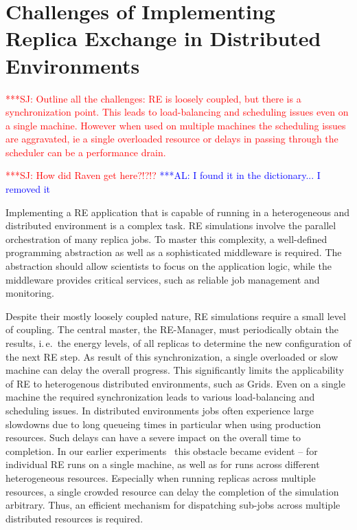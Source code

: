 \documentclass{rspublic}
\newcommand{\alnote}[1]{ {\textcolor{blue} { ***AL: #1 }}}
\newcommand{\jhanote}[1]{ {\textcolor{red} { ***SJ: #1 }}}
\newcommand{\alnote}[1]{}
\newcommand{\jhanote}[1]{}
\begin{document}

\section{Challenges of Implementing Replica Exchange in Distributed
  Environments}
\label{sec:challenges}
\jhanote{Outline all the challenges: RE is loosely coupled, but there
  is a synchronization point. This leads to load-balancing and
  scheduling issues even on a single machine. However when used on
  multiple machines the scheduling issues are aggravated, ie a single
  overloaded resource or delays in passing through the scheduler can
  be a performance drain.}                
                                               

\jhanote{How did Raven get here?!?!?}
\alnote{I found it in the dictionary... I removed it}  

Implementing a RE application that is capable of running in a
heterogeneous and distributed environment is a complex task. RE simulations 
involve the parallel orchestration of many replica jobs. To master 
this complexity, a well-defined programming abstraction as well
as a sophisticated middleware is required. The abstraction
should allow scientists to focus on the application logic, while the 
middleware provides critical services, such as reliable 
job management and monitoring.

Despite their mostly loosely coupled nature, RE simulations require
a small level of coupling.  The central master, the RE-Manager, must
periodically obtain the results, i.\,e.\ the energy levels, of all
replicas to determine the new configuration of the next RE step.  As
result of this synchronization, a single overloaded or slow machine
can delay the overall progress. This significantly limits the
applicability of RE to heterogenous distributed environments, such
as Grids.  Even on a single machine the required synchronization leads
to various load-balancing and scheduling issues. In distributed
environments jobs often experience large slowdowns due to
long queueing times in particular when using production resources. 
Such delays can have a severe impact on the overall time to
completion.                                                    
In our earlier experiments~\citep{Luckow:2008la} this obstacle  
became evident -- for individual RE runs on a single machine, 
as well as for runs across different heterogeneous resources.
Especially when running replicas across multiple resources, 
a single crowded resource can delay the completion of the simulation arbitrary. 
Thus, an efficient
mechanism for dispatching sub-jobs across multiple distributed resources
is required.
\end{document}
